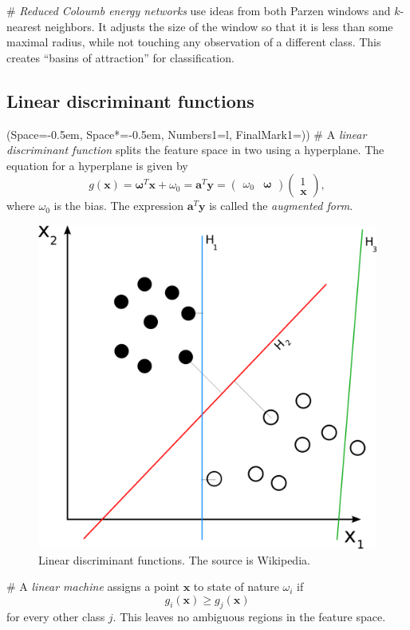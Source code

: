 \documentclass[12pt, a4paper]{article}
\newcommand{\listSpace}{-0.5em}%
\newcommand{\vect}[1]{\bm{#1}}
\begin{document}
\begin{easylist}[itemize]
# \emph{Reduced Coloumb energy networks} use ideas from both Parzen windows and $k$-nearest neighbors.
It adjusts the size of the window so that it is less than some maximal radius, while not touching any observation of a different class.
This creates ``basins of attraction'' for classification.
\end{easylist}



\subsection{Linear discriminant functions}
\begin{easylist}[itemize]
\ListProperties(Space=\listSpace, Space*=\listSpace, Numbers1=l, FinalMark1={)})
# A \emph{linear discriminant function} splits the feature space in two using a hyperplane.
The equation for a hyperplane is given by
\begin{equation*}
	g(\vect{x}) = \vect{\omega}^T \vect{x} + \omega_0 = \vect{a}^T \vect{y} =
	\begin{pmatrix}
	\omega_0 & \vect{\omega}
	\end{pmatrix}
	\begin{pmatrix}
	1 \\
	\vect{x}
	\end{pmatrix},
\end{equation*}
where $\omega_0$ is the bias. 
The expression $\vect{a}^T \vect{y}$ is called the \emph{augmented form}.

\begin{figure}[ht!]
	\centering
	\includegraphics[width=0.35\linewidth]{figs/separating_hyperplanes}
	\caption{Linear discriminant functions. The source is Wikipedia.}
	\label{fig:separating_hyperplanes}
\end{figure}

# A \emph{linear machine} assigns a point $\vect{x}$ to state of nature $\omega_i$ if
\begin{equation*}
	g_i( \vect{x} ) \geq g_j( \vect{x} )
\end{equation*}
for every other class $j$.
This leaves no ambiguous regions in the feature space.


\end{easylist}
\end{document}
